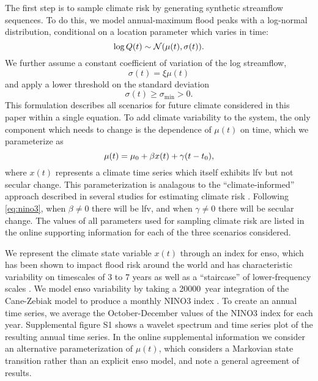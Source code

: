 \documentclass[
  draft,
  linenumbers
]{agujournal2019}
\begin{document}
The first step is to sample climate risk by generating synthetic streamflow sequences.
To do this, we model  annual-maximum flood peaks with a log-normal distribution, conditional on a location parameter which varies in time:
\begin{equation} \label{eq:log-normal}
  \log Q(t) \sim \mathcal{N} \qty(\mu(t), \sigma(t)).
\end{equation}
We further assume a constant coefficient of variation of the log streamflow,
\begin{equation}
  \sigma(t) = \xi \mu(t)  
\end{equation}
and apply a lower threshold on the standard deviation
\begin{equation}
  \sigma(t) \geq \sigma_\text{min} > 0.
\end{equation}
This formulation describes all scenarios for future climate considered in this paper within a single equation.
To add climate variability to the system, the only component which needs to change is the dependence of $\mu(t)$ on time, which we parameterize as
\begin{equation}\label{eq:nino3}
  \mu(t) = \mu_0 + \beta x(t) + \gamma \qty(t - t_0),
\end{equation}
where $x(t)$ represents a climate time series which itself exhibits \gls{lfv} but not secular change.
This parameterization is analagous to the ``climate-informed'' approach described in several studies for estimating climate risk \citep{Delgado:2014ey,Merz:2014gf,Farnham:2018gs}.
Following \cref{eq:nino3}, when $\beta \neq 0$ there will be \gls{lfv}, and when $\gamma \neq 0$ there will be secular change.
The values of all parameters used for sampling climate risk are listed in the online supporting information for each of the three scenarios considered.

We represent the climate state variable $x(t)$ through an index for \gls{enso}, which has been shown to impact flood risk around the world \citep{Ropelewski:1987do, Ward:2014gg} and has characteristic variability on timescales of 3 to 7 years \citep{Sarachik:2009dr} as well as a ``staircase'' of lower-frequency scales \citep{Jin:1994wq}.
We model \gls{enso} variability by taking a \SI{20000}{year} integration of the Cane-Zebiak model \citep{Zebiak:1987cl} to produce a monthly NINO3 index \citep{Ramesh:2016hf}.
To create an annual time series, we average the October-December values of the NINO3 index for each year.
Supplemental figure S1 shows a wavelet spectrum and time series plot of the resulting annual time series.
In the online supplemental information we consider an alternative parameterization of $\mu(t)$, which considers a Markovian state transition rather than an explicit \gls{enso} model, and note a general agreement of results.
\end{document}
